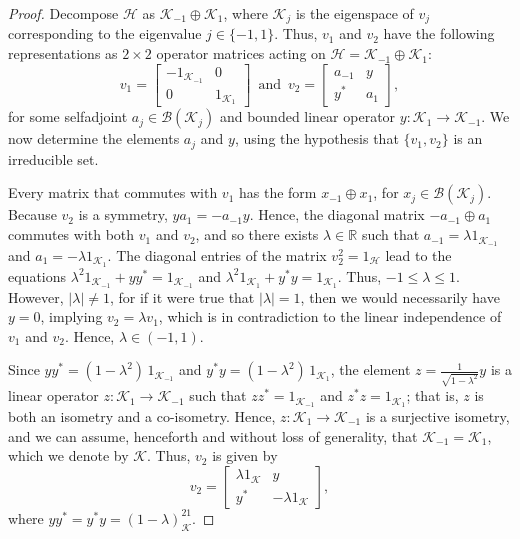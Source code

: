 \documentclass{amsart}
\theoremstyle{definition}
\theoremstyle{remark}
\newcommand{\B}{\mathcal{B}}
\renewcommand{\H}{\mathcal{H}}
\newcommand{\K}{\mathcal K}
\numberwithin{equation}{section}
\begin{document}
\begin{proof} Decompose $\H$ as $\K_{-1}\oplus\K_{1}$, 
	where $\K_j$ is the eigenspace of $v_j$ corresponding to the eigenvalue $j\in\{-1,1\}$. Thus, $v_1$ and
	$v_2$ have the following representations as $2\times 2$ operator matrices acting on $\H=\K_{-1}\oplus\K_{1}$:
	\[
	v_1=\left[ \begin{array}{cc} -1_{\K_{-1}} &0 \\ 0 & 1_{\K_1} \end{array}\right]
	\,\mbox{ and }\,
	v_2=\left[ \begin{array}{cc} a_{-1}&y \\ y^* & a_{1} \end{array}\right],
	\]
	for some selfadjoint $a_j\in\B(\K_j)$ and bounded linear operator $y:\K_{1}\rightarrow\K_{-1}$.
	We now determine the elements $a_j$ and $y$, using the hypothesis that $\{v_1,v_2\}$ is an irreducible set.
	
	Every matrix that commutes with $v_1$ has the form $x_{-1}\oplus x_{1}$, for $x_j\in\B(\K_j)$.
	Because $v_2$ is a symmetry, $ya_{1}=-a_{-1}y$. Hence, the diagonal matrix 
	$-a_{-1}\oplus a_{1}$
	commutes with both $v_1$ and $v_2$, and so there exists
	$\lambda\in\mathbb R$ such that $a_{-1}=\lambda1_{\K_{-1}}$ and
	$a_1=-\lambda1_{\K_1}$. The diagonal entries of the matrix 
	$v_2^2=1_\H$ lead to the equations $\lambda^2 1_{\K_{-1}}+yy^*=1_{\K_{-1}}$ and
	$\lambda^2 1_{\K_{1}}+y^*y=1_{\K_{1}}$. Thus, $-1\leq\lambda\leq1$. However, $|\lambda|\not=1$, 
	for if it were true that $|\lambda|=1$, then we would necessarily have $y=0$, implying $v_2=\lambda v_1$,
	which is in contradiction to the linear independence of $v_1$ and $v_2$. Hence, $\lambda\in(-1,1)$.
	
	Since $yy^*=(1-\lambda^2)\,1_{\K_{-1}}$ and $y^*y=(1-\lambda^2)\,1_{\K_{1}}$, the element $z=\frac{1}{\sqrt{1-\lambda^2}}y$ 
	is a linear operator $z:\K_{1}\rightarrow\K_{{-1}}$ such that $zz^*=1_{\K_{-1}}$ and $z^*z=1_{\K_{1}}$; that is, $z$ is both an isometry
	and a co-isometry. Hence, $z:\K_{1}\rightarrow\K_{-1}$ is a surjective isometry, and we can assume, henceforth
	and without loss of generality, that $\K_{-1}=\K_1$, which we denote by $\K$. Thus, $v_2$ is given by
	\[
	v_2=\left[\begin{array}{cc} \lambda 1_\K & y \\ y^* & -\lambda 1_\K\end{array}\right],
	\]
	where $yy^*=y^*y=(1-\lambda)^21_\K$.
	

\end{proof}
\end{document}
